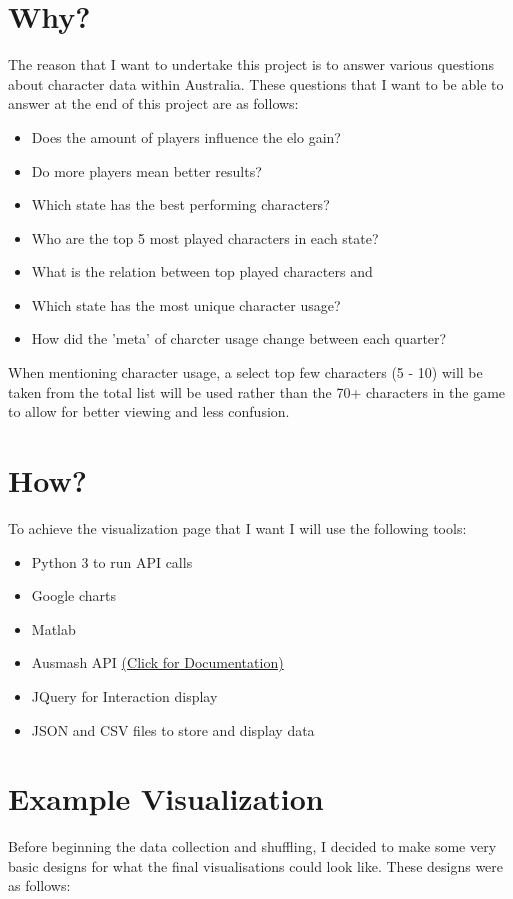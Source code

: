 \documentclass[11pt, oneside, a4paper]{article}
\begin{document}
\section*{Why?}
The reason that I want to undertake this project is to answer various questions about character data within Australia. These questions that I want to be able to answer at the end of this project are as follows:
\begin{itemize}
    \item Does the amount of players influence the elo gain?
    \item Do more players mean better results?
    \item Which state has the best performing characters?
    \item Who are the top 5 most played characters in each state?
    \item What is the relation between top played characters and 
    \item Which state has the most unique character usage?
    \item How did the 'meta' of charcter usage change between each quarter?
\end{itemize}
When mentioning character usage, a select top few characters (5 - 10) will be taken from the total list will be used rather than the 70+ characters in the game to allow for better viewing and less confusion.

\section*{How?}
To achieve the visualization page that I want I will use the following tools:
\begin{itemize}
    \item Python 3 to run API calls
    \item Google charts
    \item Matlab
    \item Ausmash API \href{https://api.ausmash.com.au/swagger/ui/index#/}{(Click for Documentation)}
    \item JQuery for Interaction display
    \item JSON and CSV files to store and display data
\end{itemize}

\section*{Example Visualization}
Before beginning the data collection and shuffling, I decided to make some very basic designs for what the final visualisations could look like. These designs were as follows:
\end{document}
